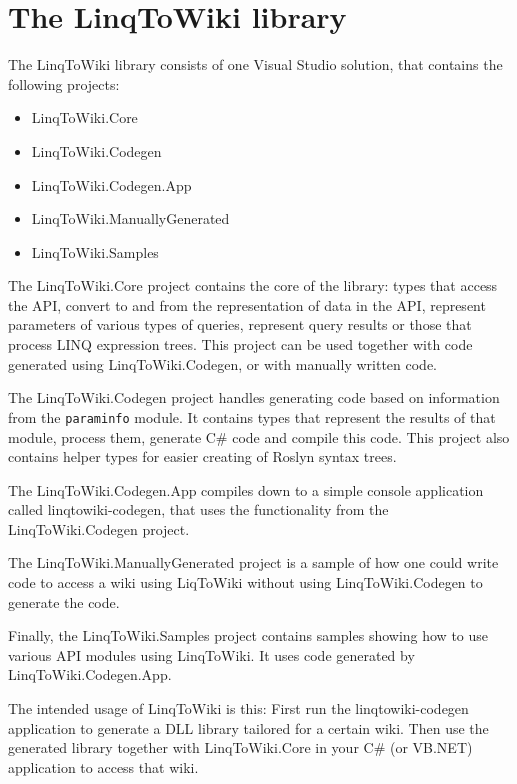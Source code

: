 \chapter{The LinqToWiki library}

The LinqToWiki library consists of one Visual Studio solution, that contains the following projects:

\begin{itemize}
\item LinqToWiki.Core
\item LinqToWiki.Codegen
\item LinqToWiki.Codegen.App
\item LinqToWiki.ManuallyGenerated
\item LinqToWiki.Samples
\end{itemize}

The LinqToWiki.Core project contains the core of the library:
types that access the API, convert to and from the representation of data in the API,
represent parameters of various types of queries, represent query results
or those that process LINQ expression trees.
This project can be used together with code generated using LinqToWiki.Codegen,
or with manually written code.

The LinqToWiki.Codegen project handles generating code based on information from the \texttt{paraminfo} module.
It contains types that represent the results of that module, process them, generate C\# code and compile this code.
This project also contains helper types for easier creating of Roslyn syntax trees.

The LinqToWiki.Codegen.App compiles down to a simple console application called linqtowiki-codegen,
that uses the functionality from the LinqToWiki.\allowbreak{}Codegen project.

The LinqToWiki.ManuallyGenerated project is a sample of how one could write code to access a wiki using LiqToWiki without using LinqToWiki.Codegen to generate the code.

Finally, the LinqToWiki.Samples project contains samples showing how to use various API modules using LinqToWiki.
It uses code generated by LinqToWiki.\allowbreak{}Codegen.\allowbreak{}App.

\medskip

The intended usage of LinqToWiki is this:
First run the linqtowiki-codegen application to generate a DLL library tailored for a certain wiki.
Then use the generated library together with LinqToWiki.Core in your C\# (or VB.NET) application to access that wiki.

